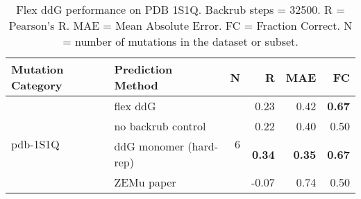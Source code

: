 \begin{table}
  \begin{tabular}{llrrrr}
\toprule
Mutation Category &       Prediction Method &  N &     R &  MAE &   FC \\
\midrule
 \multirow{ 4}{*}{pdb-1S1Q} & flex ddG & \multirow{ 4}{*}{6} & 0.23 & 0.42 & \textbf{0.67}  \\
 & no backrub control & & 0.22 & 0.40 & 0.50  \\
 & ddG monomer (hard-rep) & & \textbf{0.34} & \textbf{0.35} & \textbf{0.67}  \\
 & ZEMu paper & & -0.07 & 0.74 & 0.50  \\
\bottomrule
\end{tabular}
  \caption[Flex ddG performance on PDB 1S1Q]{
    Flex ddG performance on PDB 1S1Q. Backrub steps = 32500. R = Pearson's R. MAE = Mean Absolute Error. FC = Fraction Correct. N = number of mutations in the dataset or subset.
  } \label{tab:table-pdb-1S1Q}
\end{table}

